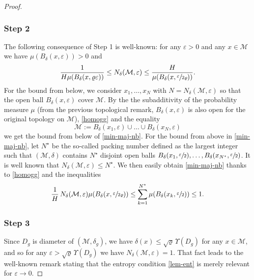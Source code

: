 \documentclass[JEP,XML,SOM,Unicode,NoEqCountersInSection,published]{cedram}
\theoremstyle{theorem}
\theoremstyle{definition}
\newcommand\ep{\varepsilon}
\begin{document}
\begin{proof}
\subsubsection*{Step 2} The following consequence of Step 1 is well-known: for any $\ep>0$ and any $x\in\mathcal{M}$ we have $\mu(B_{\delta}(x,\ep))>0$ and
\begin{equation}\label{min-maj-nb}
\frac{1}{H\mu(B_\delta(x,\varrho\ep))} \leq N_\delta(\mathcal{M},\ep) \leq \frac{H}{\mu(B_\delta(x,\sfrac{\ep}{2\varrho}))}.
\end{equation}
For the bound from below, we consider $x_1,\dots,x_N$ with $N=N_\delta(\mathcal{M},\ep)$ so that the open ball $B_{\delta}(x,\ep)$ cover $\mathcal{M}$. By the the subadditivity of the probability measure $\mu$ (from the previous topological remark, $B_\delta(x,\ep)$ is also open for the original topology on $\mathcal{M}$), \eqref{homogg} and the equality
\begin{equation*}
\mathcal{M}:=B_{\delta}(x_1,\ep)\cup\dots \cup B_{\delta}(x_N,\ep)
\end{equation*}
we get the bound from below of \eqref{min-maj-nb}.
For the bound from above in \eqref{min-maj-nb}, let $N^\star$ be the so-called packing number defined as the largest integer such that $(\mathcal{M},\delta)$ contains $N^\star$ disjoint open balls $B_{\delta}(x_1,\sfrac{\ep}{2}),\dots,B_{\delta}(x_{N^\star},\sfrac{\ep}{2})$. It is well known that \hbox{$N_\delta(\mathcal{M},\ep)\leq N^\star$}. We then easily obtain \eqref{min-maj-nb} thanks to \eqref{homogg} and the inequalities
\begin{equation*}
\frac{1}{H}\, N_{\delta}(\mathcal{M},\ep) \mu(B_{\delta}(x,\sfrac{\ep}{2\varrho}))\leq \sum_{k=1}^{N^\star} \mu(B_{\delta}(x_k,\sfrac{\ep}{2})) \leq 1.
\end{equation*}

\subsubsection*{Step 3} Since $D_g$ is diameter of $(\mathcal{M},\delta_g)$, we have
$\delta(x)\leq \sqrt{\varrho}\,\Upsilon(D_g)$ for any $x\in \mathcal{M}$, and so for any $\ep>\sqrt{\varrho}\,\Upsilon(D_g)$ we have $N_\delta(\mathcal{M},\ep)=1$. That fact leads to the well-known remark stating that the entropy condition \eqref{lem-ent} is merely relevant for $\ep\to 0$.


\end{proof}
\end{document}
